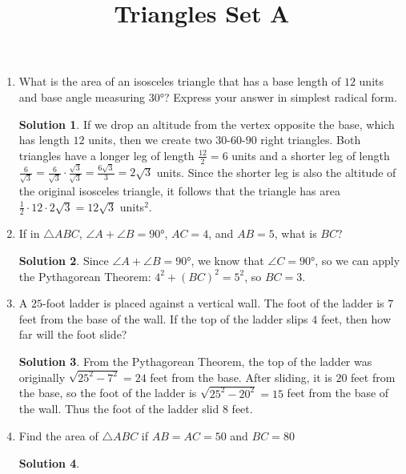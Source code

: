 \documentclass{article}
\title{Triangles Set A}
\date{}
\author{}
\theoremstyle{definition}
\newtheorem*{solution}{Solution}
\begin{document}
\maketitle

\begin{multicols}{2}
    \begin{enumerate}
        \item What is the area of an isosceles triangle that has a base length of $12$ units and base angle measuring $\ang{30}$?
            Express your answer in simplest radical form.
            \begin{solution}
               If we drop an altitude from the vertex opposite the base, which has length $12$ units, then we create two $30$-$60$-$90$ right triangles.
               Both triangles have a longer leg of length $\frac{12}{2} = 6$ units and a shorter leg of length $\frac{6}{\sqrt{3}} = \frac{6}{\sqrt{3}} \cdot \frac{\sqrt{3}}{\sqrt{3}} = \frac{6\sqrt{3}}{3} = 2\sqrt{3}$ units.
               Since the shorter leg is also the altitude of the original isosceles triangle, it follows that the triangle has area $\frac{1}{2} \cdot 12 \cdot 2\sqrt{3} = 12\sqrt{3}$ units$^{2}$. 
            \end{solution}
            \item If in $\triangle ABC$, $\angle A + \angle B = \ang{90}$, $AC = 4$, and $AB = 5$, what is $BC$?
            \begin{solution}
                Since $\angle A + \angle B = \ang{90}$, we know that $\angle C = \ang{90}$, so we can apply the Pythagorean Theorem: $4^2 + (BC)^2 = 5^2$, so $BC = 3$.
            \end{solution}
        \item A $25$-foot ladder is placed against a vertical wall.
            The foot of the ladder is $7$ feet from the base of the wall.
            If the top of the ladder slips $4$ feet, then how far will the foot slide?
            \begin{solution}
                From the Pythagorean Theorem, the top of the ladder was originally $\sqrt{25^2 - 7^2} = 24$ feet from the base.
                After sliding, it is $20$ feet from the base, so the foot of the ladder is $\sqrt{25^2 - 20^2} = 15$ feet from the base of the wall.
                Thus the foot of the ladder slid $8$ feet.
            \end{solution}
            \item Find the area of $\triangle ABC$ if $AB = AC = 50$ and $BC = 80$
            \begin{solution}

\end{solution}
\end{enumerate}
\end{multicols}
\end{document}
